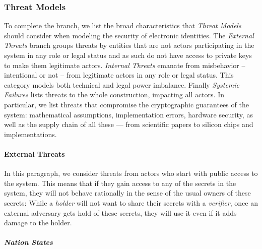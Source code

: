 \subsubsection{Threat Models}
\label{subsub:threat_models}

To complete the \emph{\rot} branch, we list the broad characteristics that \emph{Threat Models} should consider when modeling the security of electronic identities.
The \emph{External Threats} branch groups threats by entities that are not actors participating in the system in any role or legal status and as such do not have access to private keys to make them legitimate actors.
\emph{Internal Threats} emanate from misbehavior -- intentional or not -- from legitimate actors in any role or legal status. This category models both technical and legal power imbalance.
Finally \emph{Systemic Failures} lists threats to the whole construction, impacting all actors. In particular, we list threats that compromise the cryptographic guarantees of the system: mathematical assumptions, implementation errors, hardware security, as well as the supply chain of all these --- from scientific papers to silicon chips and implementations.

\vspace{1em}



\paragraph{External Threats}

In this paragraph, we consider threats from actors who start with public access
to the system.
This means that if they gain access to any of the secrets in the system, they will
not behave rationally in the sense of the usual owners of these secrets:
While a \emph{holder} will not want to share their secrets with a \emph{verifier},
once an external adversary gets hold of these secrets, they will use it even if it adds
damage to the holder.

\subparagraph{Nation States}
\label{subp:nation_state}

